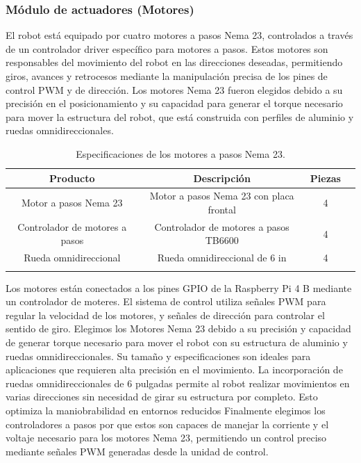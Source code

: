     \subsubsection{M\'odulo de actuadores (Motores)} %
    \label{ssub:modact}
    El robot est\'a equipado por cuatro motores a pasos Nema 23, controlados a trav\'es de
        un controlador driver espec\'ifico para motores a pasos. Estos motores son
        responsables del movimiento del robot en las direcciones deseadas, permitiendo giros,
        avances y retrocesos mediante la manipulaci\'on precisa de los pines de control PWM y
        de direcci\'on.
    \vskip 0.5cm
    Los motores Nema 23 fueron elegidos debido a su precisi\'on en el posicionamiento y
        su capacidad para generar el torque necesario para mover la estructura del robot, que
        est\'a construida con perfiles de aluminio y ruedas omnidireccionales.
    \vskip 0.5cm
    \begin{longtable}{|c|c|c|c|}
        \hline
        \rowcolor{gray}
        \textbf{Producto} & \textbf{Descripci\'on} & \textbf{Piezas} \\
        \hline
        Motor a pasos Nema 23 & Motor a pasos Nema 23 con placa frontal & 4  \\
        Controlador de motores a pasos & Controlador de motores a pasos TB6600 & 4  \\
        Rueda omnidireccional & Rueda omnidireccional de 6 in & 4  \\
        \hline
        \caption{Especificaciones de los motores a pasos Nema 23.}
        \label{tab:motor}
    \end{longtable}
    \vskip 0.5cm
    Los motores est\'an conectados a los pines GPIO de la Raspberry Pi 4 B mediante un
        controlador de moteres. El sistema de control utiliza se\~nales PWM para regular la
        velocidad de los motores, y se\~nales de direcci\'on para controlar el sentido de giro.
    \vskip 0.5cm
    Elegimos los Motores Nema 23 debido a su precisi\'on y capacidad de generar torque
        necesario para mover el robot con su estructura de aluminio y ruedas
        omnidireccionales. Su tama\~no y especificaciones son ideales para aplicaciones que
        requieren alta precisi\'on en el movimiento.
    \vskip 0.5cm
    La incorporaci\'on de ruedas omnidireccionales de 6 pulgadas permite al robot realizar
        movimientos en varias direcciones sin necesidad de girar su estructura por completo.
        Esto optimiza la maniobrabilidad en entornos reducidos
    \vskip 0.5cm
    Finalmente elegimos los controladores a pasos por que estos son capaces de manejar
        la corriente y el voltaje necesario para los motores Nema 23, permitiendo un control
        preciso mediante se\~nales PWM generadas desde la unidad de control.
    \vskip 0.5cm
